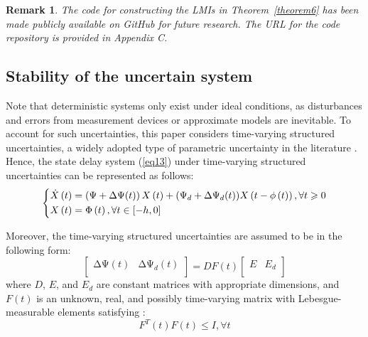 \documentclass[a4paper]{cas-sc}
\newtheorem{remark}[theorem]{Remark}
\begin{document}
\begin{remark}
  \label{remark7}
  The code for constructing the LMIs in Theorem~\ref{theorem6} has been made publicly available on GitHub for future research. The URL for the code repository is provided in Appendix C.
\end{remark}


\subsection{Stability of the uncertain system}
\label{Section 4.2}

Note that deterministic systems only exist under ideal conditions, as disturbances and errors from measurement devices or approximate models are inevitable. To account for such uncertainties, this paper considers time-varying structured uncertainties, a widely adopted type of parametric uncertainty in the literature \citep{shamma1994robust,he2012robust,liu2021matrix,fiengo2019distributed}. Hence, the state delay system (\ref{eq13}) under time-varying structured uncertainties can be represented as follows:
\begin{equation}
  \left\{ \begin{gathered}
    \dot X\left( t \right) = \left( {\Psi  + \Delta \Psi (t)} \right)X\left( t \right) + ({\Psi _d} + \Delta {\Psi _d}(t))X\left( {t - \phi \left( t \right)} \right),\forall t \geqslant 0 \hfill \\
    X\left( t \right) = \Phi \left( t \right),\forall t \in \left[ { - h,0} \right] \hfill \\ 
  \end{gathered}  \right.
  \label{eq25}
\end{equation}

Moreover, the time-varying structured uncertainties are assumed to be in the following form:
\begin{equation}
\left[\begin{matrix}\mathrm{\Delta\Psi}(t)&\mathrm{\Delta}\mathrm{\Psi}_d(t)\\\end{matrix}\right]=DF(t)\left[\begin{matrix}E&E_d\\\end{matrix}\right]  
\label{eq26}
\end{equation}
where $D$, $E$, and $E_d$ are constant matrices with appropriate dimensions, and $F(t)$ is an unknown, real, and possibly time-varying matrix with Lebesgue-measurable elements satisfying \citep{berry1935linear}:
\begin{equation}
F^T(t)F(t)\leqslant I,\forall t    
\label{eq27}
\end{equation}
\end{document}

